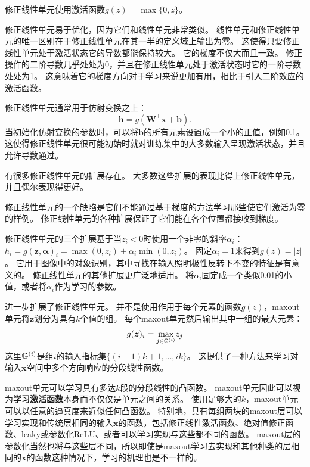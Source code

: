 修正线性单元使用激活函数$g(z)=\max\{0, z\}$。

修正线性单元易于优化，因为它们和线性单元非常类似。
线性单元和修正线性单元的唯一区别在于修正线性单元在其一半的定义域上输出为零。
这使得只要修正线性单元处于激活状态它的导数都能保持较大。
它的梯度不仅大而且一致。
修正操作的二阶导数几乎处处为0，并且在修正线性单元处于激活状态时它的一阶导数处处为1。
这意味着它的梯度方向对于学习来说更加有用，相比于引入二阶效应的激活函数。

修正线性单元通常用于仿射变换之上：
\begin{equation}
\bm{h} = g(\bm{W}^\top \bm{x} + \bm{b}).
\end{equation}
当初始化仿射变换的参数时，可以将$\bm{b}$的所有元素设置成一个小的正值，例如0.1。
这使得修正线性单元很可能初始时就对训练集中的大多数输入呈现激活状态，并且允许导数通过。

有很多修正线性单元的扩展存在。
大多数这些扩展的表现比得上修正线性单元，并且偶尔表现得更好。

修正线性单元的一个缺陷是它们不能通过基于梯度的方法学习那些使它们激活为零的样例。
修正线性单元的各种扩展保证了它们能在各个位置都接收到梯度。

修正线性单元的三个扩展基于当$z_i<0$时使用一个非零的斜率$\alpha_i$：$h_i =g(\bm{z}, \bm{\alpha})_i = \max(0, z_i) + \alpha_i \min(0, z_i)$。
固定$\alpha_i=1$来得到$g(z)=|z|$。
它用于图像中的对象识别\citep{Jarrett-ICCV2009}，其中寻找在输入照明极性反转下不变的特征是有意义的。
修正线性单元的其他扩展更广泛地适用。
\citep{Maas-et-al-ICML2013}将$\alpha_i$固定成一个类似0.01的小值，或者\textbf{}将$\alpha_i$作为学习的参数\citep{He-et-al-arxiv2015}。


\citep{Goodfellow_maxout_2013}进一步扩展了修正线性单元。
并不是使用作用于每个元素的函数$g(z)$，maxout单元将$\bm{z}$划分为具有$k$个值的组。
每个maxout单元然后输出其中一组的最大元素：
\begin{equation}
g(\bm{z})_i = \underset{j\in \mathbb{G}^{(i)}}{\max} z_j
\end{equation}
这里$\mathbb{G}^{(i)}$是组$i$的输入指标集$\{(i-1)k+1, \ldots, ik\}$。
这提供了一种方法来学习对输入$\bm{x}$空间中多个方向响应的分段线性函数。

maxout单元可以学习具有多达$k$段的分段线性的凸函数。
maxout单元因此可以视为\textbf{学习激活函数}本身而不仅仅是单元之间的关系。
使用足够大的$k$，maxout单元可以以任意的逼真度来近似任何凸函数。
特别地，具有每组两块的maxout层可以学习实现和传统层相同的输入$\bm{x}$的函数，包括修正线性激活函数、绝对值修正函数、leaky或参数化ReLU、或者可以学习实现与这些都不同的函数。
maxout层的参数化当然也将与这些层不同，所以即使是maxout学习去实现和其他种类的层相同的$\bm{x}$的函数这种情况下，学习的机理也是不一样的。

